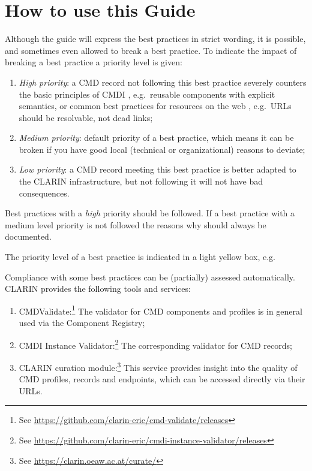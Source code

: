 \section{How to use this Guide}\label{howto}

Although the guide will express the best practices in strict wording, it is possible, and sometimes even allowed to break a best practice. To indicate the impact of breaking a best practice a priority level is given:

\begin{enumerate}
\def\labelenumi{\arabic{enumi}.}
\tightlist
\item
  \emph{High priority}: a CMD record not following this best practice severely counters the basic principles of CMDI \cite{lrec2012cmdi}, e.g.~reusable components with explicit semantics, or common best practices for resources on the web \cite{w3cstyle,dwbp}, e.g.~URLs should be resolvable, not dead links;
\item
  \emph{Medium priority}: default priority of a best practice, which means it can be broken if you have good local (technical or organizational) reasons to deviate;
\item
  \emph{Low priority}: a CMD record meeting this best practice is better adapted to the CLARIN infrastructure, but not following it will not have bad consequences.
\end{enumerate}

Best practices with a \emph{high} priority should be followed. If a best practice with a medium level priority is not followed the reasons why should always be documented.

The priority level of a best practice is indicated in a light yellow box, e.g.

Compliance with some best practices can be (partially) assessed
automatically. CLARIN provides the following tools and services:

\begin{enumerate}
\def\labelenumi{\arabic{enumi}.}
\tightlist
\item
  CMDValidate:\footnote{See
    \url{https://github.com/clarin-eric/cmd-validate/releases}} The validator for CMD components and profiles is in general used via the Component Registry;
\item
  CMDI Instance Validator:\footnote{See
    \url{https://github.com/clarin-eric/cmdi-instance-validator/releases}}
  The corresponding validator for CMD records;
\item
  CLARIN curation module:\footnote{See
    \url{https://clarin.oeaw.ac.at/curate/}} This service provides insight into the quality of CMD profiles, records and endpoints, which can be accessed directly via their URLs.
\end{enumerate}

